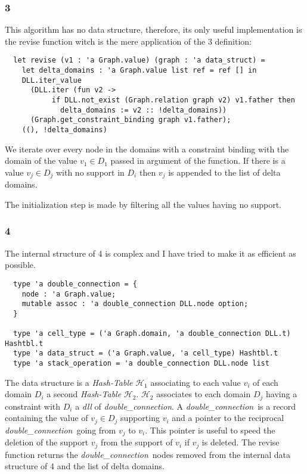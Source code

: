 \documentclass{rapport}
\begin{document}
\subsubsection{\ac{3}}

This algorithm has no data structure, therefore, its only useful implementation is the revise function witch is the mere application of the \ac{3} definition:

\begin{verbatim}
  let revise (v1 : 'a Graph.value) (graph : 'a data_struct) =
    let delta_domains : 'a Graph.value list ref = ref [] in
    DLL.iter_value
      (DLL.iter (fun v2 ->
           if DLL.not_exist (Graph.relation graph v2) v1.father then
             delta_domains := v2 :: !delta_domains))
      (Graph.get_constraint_binding graph v1.father);
    ((), !delta_domains)
\end{verbatim}

We iterate over every node in the domains with a constraint binding with the domain of the value $v_1 \in D_1$ passed in argument of the function. If there is a value $v_j \in D_j$ with no support in $D_i$ then $v_j$ is appended to the list of delta domains.

The initialization step is made by filtering all the values having no support.

\subsubsection{\ac{4}}

The internal structure of \ac{4} is complex and I have tried to make it as efficient as possible.

\begin{verbatim}
  type 'a double_connection = {
    node : 'a Graph.value;
    mutable assoc : 'a double_connection DLL.node option;
  }

  type 'a cell_type = ('a Graph.domain, 'a double_connection DLL.t) Hashtbl.t
  type 'a data_struct = ('a Graph.value, 'a cell_type) Hashtbl.t
  type 'a stack_operation = 'a double_connection DLL.node list
\end{verbatim}

\def\dc{\textit{double\_connection}}
\def\ds{\textit{data\_struct}}

The data structure is a \textit{Hash-Table} $\mathcal{H}_1$ associating to each value $v_i$ of each domain $D_i$ a second \textit{Hash-Table} $\mathcal{H}_2$. $\mathcal{H}_2$ associates to each domain $D_j$ having a constraint with $D_i$ a \textit{dll} of \dc. A \dc\ is a record containing the value of $v_j \in D_j$ supporting $v_i$ and a pointer to the reciprocal \dc\ going from $v_j$ to $v_i$. This pointer is useful to speed the deletion of the support $v_j$ from the support of $v_i$ if $v_j$ is deleted. The revise function returns the \dc\ nodes removed from the internal data structure of \ac{4} and the list of delta domains.
\end{document}
